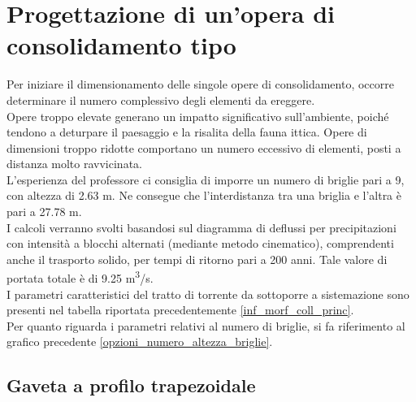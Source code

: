 \section{Progettazione di un'opera di consolidamento tipo}
Per iniziare il dimensionamento delle singole opere di consolidamento, occorre determinare il numero complessivo degli elementi da ereggere.\\
Opere troppo elevate generano un impatto significativo sull'ambiente, poiché tendono a deturpare il paesaggio e la risalita della fauna ittica. Opere di dimensioni troppo ridotte comportano un numero eccessivo di elementi, posti a distanza molto ravvicinata.\\
L'esperienza del professore ci consiglia di imporre un numero di briglie pari a 9, con altezza di 2.63 m. Ne consegue che l'interdistanza tra una briglia e l'altra è pari a 27.78 m.\\
I calcoli verranno svolti basandosi sul diagramma di deflussi per precipitazioni con intensità a blocchi alternati (mediante metodo cinematico), comprendenti anche il trasporto solido, per tempi di ritorno pari a 200 anni. Tale valore di portata totale è di 9.25 \unit{m^3/s}.\\
I parametri caratteristici del tratto di torrente da sottoporre a sistemazione sono presenti nel tabella riportata precedentemente \ref{inf_morf_coll_princ}.\\
Per quanto riguarda i parametri relativi al numero di briglie, si fa riferimento al grafico precedente \ref{opzioni_numero_altezza_briglie}.
\subsection{Gaveta a profilo trapezoidale}

